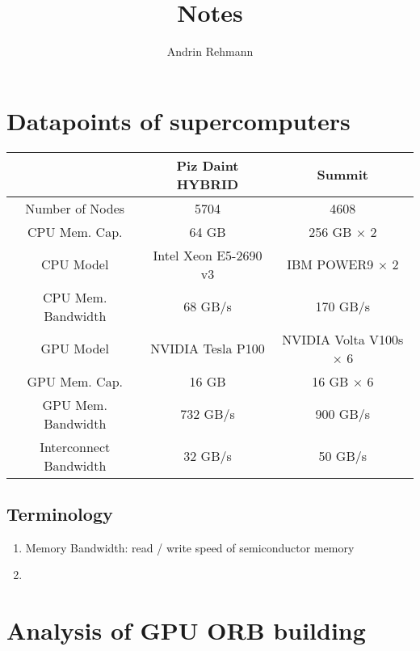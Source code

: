 \documentclass[]{article}
\title{Notes}
\author{Andrin Rehmann}
\begin{document}
\maketitle

\section{Datapoints of supercomputers}

\begin{center}
	\begin{tabular}{ c c c }
		& Piz Daint HYBRID \cite{piz_daint} & Summit \\ 
		\hline
		Number of Nodes & 5704 & 4608\\
		CPU Mem. Cap. & 64 GB & 256 GB $\times$ 2  \\   
		CPU Model & Intel Xeon E5-2690 v3 & IBM POWER9 $\times$ 2 \\
		CPU Mem. Bandwidth  & 68 GB/s & 170 GB/s\\
		GPU Model & NVIDIA Tesla P100 & NVIDIA Volta V100s $\times$ 6 \\
		GPU Mem. Cap. & 16 GB & 16 GB $\times$ 6\\
		GPU Mem. Bandwidth & 732 GB/s & 900 GB/s \\
		Interconnect Bandwidth & 32 GB/s & 50 GB/s \\
	\end{tabular}
\end{center}

\subsection{Terminology}

\begin{enumerate}
	\item Memory Bandwidth: read / write speed of semiconductor memory
	\item 

\end{enumerate}

\section{Analysis of GPU ORB building}
\end{document}
